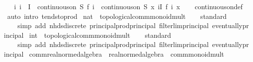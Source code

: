 \begin{isabellebody}
\ \ \ {\isachardoublequoteopen}{\isacharparenleft}{\kern0pt}{\isasymAnd}i{\isachardot}{\kern0pt}\ i\ {\isasymin}\ I\ {\isasymLongrightarrow}\ continuous{\isacharunderscore}{\kern0pt}on\ S\ {\isacharparenleft}{\kern0pt}f\ i{\isacharparenright}{\kern0pt}{\isacharparenright}{\kern0pt}\ {\isasymLongrightarrow}\ continuous{\isacharunderscore}{\kern0pt}on\ S\ {\isacharparenleft}{\kern0pt}{\isasymlambda}x{\isachardot}{\kern0pt}\ {\isasymProd}i{\isasymin}I{\isachardot}{\kern0pt}\ f\ i\ x{\isacharparenright}{\kern0pt}{\isachardoublequoteclose}\isanewline
%
\isadelimproof
\ \ %
\endisadelimproof
%
\isatagproof
{}\isamarkupfalse%
\ continuous{\isacharunderscore}{\kern0pt}on{\isacharunderscore}{\kern0pt}def\ \isamarkupfalse%
\ {\isacharparenleft}{\kern0pt}auto\ intro{\isacharcolon}{\kern0pt}\ tendsto{\isacharunderscore}{\kern0pt}prod{\isacharprime}{\kern0pt}{\isacharparenright}{\kern0pt}%
\endisatagproof
{\isafoldproof}%
%
\isadelimproof
\isanewline
%
\endisadelimproof
\isanewline
{}\isamarkupfalse%
\ nat\ {\isacharcolon}{\kern0pt}{\isacharcolon}{\kern0pt}\ topological{\isacharunderscore}{\kern0pt}comm{\isacharunderscore}{\kern0pt}monoid{\isacharunderscore}{\kern0pt}mult\isanewline
%
\isadelimproof
\ \ %
\endisadelimproof
%
\isatagproof
{}\isamarkupfalse%
\ standard\isanewline
\ \ \ \ {\isacharparenleft}{\kern0pt}simp\ add{\isacharcolon}{\kern0pt}\ nhds{\isacharunderscore}{\kern0pt}discrete\ principal{\isacharunderscore}{\kern0pt}prod{\isacharunderscore}{\kern0pt}principal\ filterlim{\isacharunderscore}{\kern0pt}principal\ eventually{\isacharunderscore}{\kern0pt}principal{\isacharparenright}{\kern0pt}%
\endisatagproof
{\isafoldproof}%
%
\isadelimproof
\isanewline
%
\endisadelimproof
\isanewline
{}\isamarkupfalse%
\ int\ {\isacharcolon}{\kern0pt}{\isacharcolon}{\kern0pt}\ topological{\isacharunderscore}{\kern0pt}comm{\isacharunderscore}{\kern0pt}monoid{\isacharunderscore}{\kern0pt}mult\isanewline
%
\isadelimproof
\ \ %
\endisadelimproof
%
\isatagproof
{}\isamarkupfalse%
\ standard\isanewline
\ \ \ \ {\isacharparenleft}{\kern0pt}simp\ add{\isacharcolon}{\kern0pt}\ nhds{\isacharunderscore}{\kern0pt}discrete\ principal{\isacharunderscore}{\kern0pt}prod{\isacharunderscore}{\kern0pt}principal\ filterlim{\isacharunderscore}{\kern0pt}principal\ eventually{\isacharunderscore}{\kern0pt}principal{\isacharparenright}{\kern0pt}%
\endisatagproof
{\isafoldproof}%
%
\isadelimproof
\isanewline
%
\endisadelimproof
\isanewline
{}\isamarkupfalse%
\ comm{\isacharunderscore}{\kern0pt}real{\isacharunderscore}{\kern0pt}normed{\isacharunderscore}{\kern0pt}algebra{\isacharunderscore}{\kern0pt}{}\ {\isacharequal}{\kern0pt}\ real{\isacharunderscore}{\kern0pt}normed{\isacharunderscore}{\kern0pt}algebra{\isacharunderscore}{\kern0pt}{}\ {\isacharplus}{\kern0pt}\ comm{\isacharunderscore}{\kern0pt}monoid{\isacharunderscore}{\kern0pt}mult\isanewline

\end{isabellebody}
